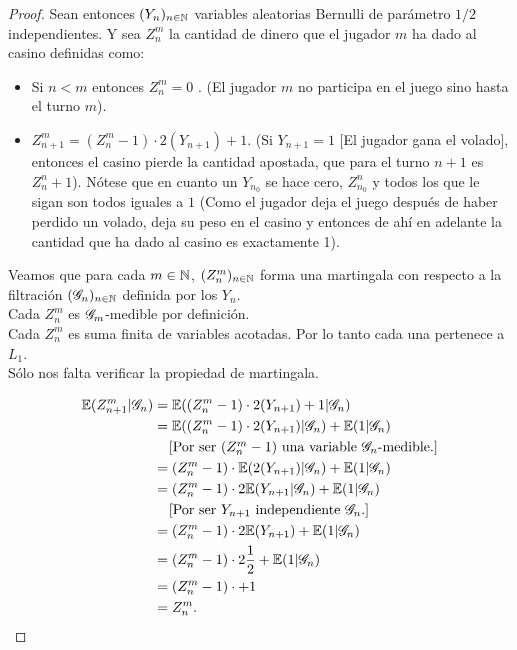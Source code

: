 \begin{proof}
		Sean entonces ${(Y_n)_{n \in \mathbb{N}}}$ variables aleatorias Bernulli de parámetro ${1/2}$ independientes.
		Y sea ${Z_n^m}$ la cantidad de dinero que el jugador ${m}$ ha dado al casino definidas como:
		
		\begin{itemize}
			\item 
				Si ${n < m}$ entonces ${Z_n^m = 0}$ . (El jugador ${m}$ no participa en el juego sino hasta el turno ${m}$).
			\item
				${Z_{n+1}^{m} = (Z_n^{m} - 1) \cdot 2(Y_{n+1}) + 1}$. (Si ${Y_{n + 1} = 1}$ [El jugador gana el volado], entonces el casino
				pierde la cantidad apostada, que para el turno ${n+1}$ es ${Z_n^n + 1}$). Nótese que en cuanto un ${Y_{n_0}}$ se hace cero,
				${Z_{n_0}^{n}}$ y todos los que le sigan son todos iguales a ${1}$ (Como el jugador deja el juego después de haber perdido
				un volado, deja su peso en el casino y entonces de ahí en adelante la cantidad que ha dado al casino es exactamente 1).
		\end{itemize}
		
		Veamos que para cada ${m \in \mathbb{N}}$, ${(Z_n^m)_{n \in \mathbb{N}}}$ forma una martingala con respecto a la filtración ${(\mathscr{G}_n)_{n \in \mathbb{N}}}$ 
		definida por los ${Y_n}$.\\
		
		Cada ${Z_n^m}$ es ${\mathscr{G}_m}$-medible por definición.\\
		
		Cada ${Z_n^m}$ es suma finita de variables acotadas. Por lo tanto cada una pertenece a ${L_1}$.\\
		
		Sólo nos falta verificar la propiedad de martingala.
		
		\begin{align}\label{problema1_3:Propiedad_de_martingala_para_el_dinero_perdido_por_un_apostador}
			\mathbb{E}(Z_{n+1}^{m} | \mathscr{G}_n) &= \mathbb{E}((Z_n^{m} - 1) \cdot 2(Y_{n+1}) + 1 | \mathscr{G}_n)\\
								   &= \mathbb{E}((Z_n^{m} -1) \cdot 2(Y_{n+1}) | \mathscr{G}_n) + \mathbb{E}( 1 | \mathscr{G}_n)\\
								   &\;\;\;\;\mbox{[Por ser ${(Z_n^{m} - 1)}$ una variable ${\mathscr{G}_n}$-medible.]}\\
								   &= (Z_n^{m} -1) \cdot \mathbb{E}(  2(Y_{n+1}) | \mathscr{G}_n) + \mathbb{E}( 1 | \mathscr{G}_n)\\
								   &= (Z_n^{m} -1) \cdot 2\mathbb{E}( Y_{n+1} | \mathscr{G}_n) + \mathbb{E}( 1 | \mathscr{G}_n)\\
								   &\;\;\;\;\mbox{[Por ser ${Y_{n + 1}}$ independiente ${\mathscr{G}_n}$.]}\\
								   &= (Z_n^{m} -1) \cdot 2\mathbb{E}( Y_{n+1}) + \mathbb{E}( 1 | \mathscr{G}_n)\\
								   &= (Z_n^{m} -1) \cdot 2 \frac{1}{2} + \mathbb{E}( 1 | \mathscr{G}_n)\\
								   &= (Z_n^{m} -1) \cdot + 1 \\
								   &= Z_n^m.
		\end{align}
		

\end{proof}
